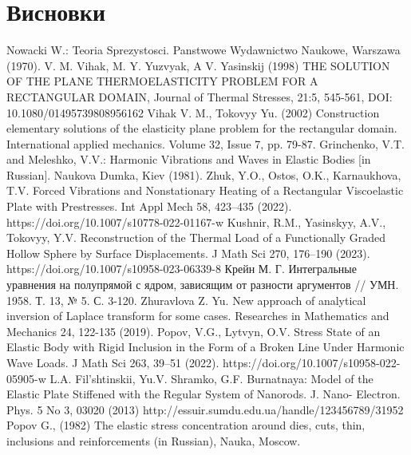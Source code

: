\documentclass[a4paper,14pt]{extarticle}
\numberwithin{equation}{section}
\begin{document}
\section*{\centering Висновки}

\newpage

\begin{thebibliography}{1}
    Nowacki W.: Teoria Sprezystosci. Panstwowe Wydawnictwo Naukowe, Warszawa (1970).
    V. M. Vihak, M. Y. Yuzvyak, A V. Yasinskij (1998) THE SOLUTION OF THE PLANE THERMOELASTICITY PROBLEM FOR A RECTANGULAR DOMAIN, Journal of Thermal Stresses, 21:5, 545-561, DOI: 10.1080/01495739808956162
    Vihak V. M., Tokovyy Yu. (2002) Construction elementary solutions of the elasticity plane problem for the rectangular domain. International applied mechanics. Volume 32, Issue 7, pp. 79-87.
    Grinchenko, V.T. and Meleshko, V.V.: Harmonic Vibrations and Waves in Elastic Bodies [in Russian]. Naukova Dumka, Kiev (1981).
    Zhuk, Y.O., Ostos, O.K., Karnaukhova, T.V. Forced Vibrations and Nonstationary Heating of a Rectangular Viscoelastic Plate with Prestresses. Int Appl Mech 58, 423–435 (2022). https://doi.org/10.1007/s10778-022-01167-w
    Kushnir, R.M., Yasinskyy, A.V., Tokovyy, Y.V. Reconstruction of the Thermal Load of a Functionally Graded Hollow Sphere by Surface Displacements. J Math Sci 270, 176–190 (2023). https://doi.org/10.1007/s10958-023-06339-8
    Крейн М. Г. Интегральные уравнения на полупрямой с ядром, зависящим от разности аргументов // УМН. 1958. Т. 13, № 5. С. 3-120.
    Zhuravlova Z. Yu. New approach of analytical inversion of Laplace transform for some cases. Researches in Mathematics and Mechanics 24, 122-135 (2019).
    Popov, V.G., Lytvyn, O.V. Stress State of an Elastic Body with Rigid Inclusion in the Form of a Broken Line Under Harmonic Wave Loads. J Math Sci 263, 39–51 (2022). https://doi.org/10.1007/s10958-022-05905-w
    L.A. Fil’shtinskii, Yu.V. Shramko, G.F. Burnatnaya: Model of the Elastic Plate Stiffened with the Regular System of Nanorods. J. Nano- Electron. Phys. 5 No 3, 03020 (2013) http://essuir.sumdu.edu.ua/handle/123456789/31952
    Popov G., (1982) The elastic stress concentration around dies, cuts, thin, inclusions and reinforcements (in Russian), Nauka, Moscow.
    

\end{thebibliography}
\end{document}

